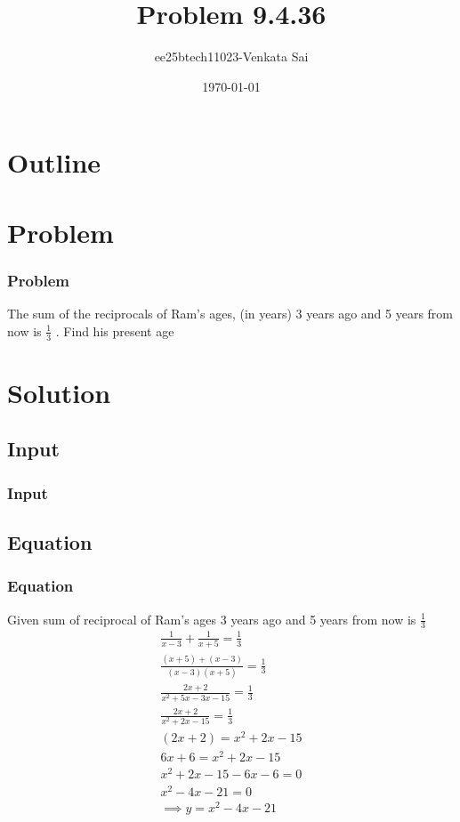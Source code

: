 \documentclass{beamer}
\title{Problem 9.4.36}
\author{ee25btech11023-Venkata Sai}
\date{\today}
\providecommand{\brak}[1]{\ensuremath{\left(#1\right)}}
\theoremstyle{remark}
\numberwithin{equation}{section}
\begin{document}
\begin{frame}
\titlepage
\end{frame}

\section*{Outline}
\begin{frame}
\tableofcontents
\end{frame}

\section{Problem}

\begin{frame}
\frametitle{Problem}
The sum of the reciprocals of Ram's ages, (in years) 3 years ago and 5 years from
now is $\frac{1}{3}$ . Find his present age
\end{frame}
\section{Solution}

\subsection{Input}
\setcounter{section}{1}
\begin{frame}
\frametitle{Input}
 
\end{frame}
\subsection{Equation}
\begin{frame}
\frametitle{Equation}
Given sum of reciprocal of Ram's ages 3 years ago and 5 years from
now is $\frac{1}{3}$
\begin{align}
\frac{1}{x-3}+\frac{1}{x+5}=\frac{1}{3} \\
\frac{\brak{x+5}+\brak{x-3}}{\brak{x-3}\brak{x+5}}=\frac{1}{3} \\
\frac{2x+2}{x^2+5x-3x-15}=\frac{1}{3}\\
\frac{2x+2}{x^2+2x-15}=\frac{1}{3}\\
\brak{2x+2}=x^2+2x-15\\
6x+6=x^2+2x-15 \\
x^2+2x-15-6x-6=0 \\
x^2-4x-21=0 \\
\implies y=x^2-4x-21 \\

  \end{align}
\end{frame}
\end{document}
